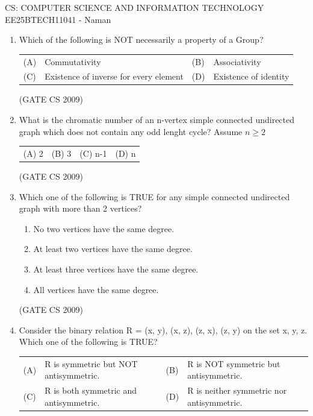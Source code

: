 \documentclass[a4paper, 11pt]{article}
\begin{document}
\begin{center}
    \huge{CS: COMPUTER SCIENCE AND INFORMATION TECHNOLOGY}\\
    \large{EE25BTECH11041 - Naman}
\end{center}

\begin{enumerate}
    \item Which of the following is NOT necessarily a property of a Group?\\
    \begin{tabularx}{\textwidth}{@{}lX lX@{}}
    (A) & Commutativity & (B) & Associativity \\
    (C) & Existence of inverse for every element & (D) & Existence of identity
    \end{tabularx}

    \hfill (GATE CS 2009)
    
    \item What is the chromatic number of an n-vertex simple connected undirected graph which does not contain any odd lenght cycle? Assume $n \geq 2$\\
    \begin{tabularx}{\textwidth}{@{}XXXX@{}}
    (A) 2 & (B) 3 &(C) n-1 & (D) n
    \end{tabularx}

    \hfill (GATE CS 2009)

    \item Which one of the following is TRUE for any simple connected undirected graph with more than 2 vertices?
    \begin{enumerate}[label=(\Alph*)]
        \item No two vertices have the same degree.
        \item At least two vertices have the same degree.
        \item At least three vertices have the same degree.
        \item All vertices have the same degree.
    \end{enumerate}

    \hfill (GATE CS 2009)

    \item Consider the binary relation R = {(x, y), (x, z), (z, x), (z, y)} on the set {x, y, z}. Which one of the following is TRUE?\\
    \begin{tabularx}{\textwidth}{@{}lX lX@{}}
    (A) & R is symmetric but NOT antisymmetric.  & (B) & R is NOT symmetric but antisymmetric.  \\
    (C) & R is both symmetric and antisymmetric. & (D) & R is neither symmetric nor antisymmetric.
    \end{tabularx}


\end{enumerate}
\end{document}
